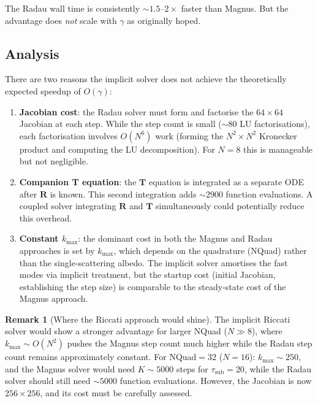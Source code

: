 \documentclass[11pt,a4paper]{article}
\newcommand{\mat}[1]{\mathbf{#1}}
\newcommand{\tsub}{\tau_{\mathrm{sub}}}
\newcommand{\kmax}{k_{\max}}
\theoremstyle{definition}
\newtheorem{remark}{Remark}
\begin{document}
The Radau wall time is consistently ${\sim}1.5$--$2\times$ faster
than Magnus.  But the advantage does \emph{not} scale with $\gamma$
as originally hoped.

\subsection{Analysis}

There are two reasons the implicit solver does not achieve the
theoretically expected speedup of $O(\gamma)$:

\begin{enumerate}
\item \textbf{Jacobian cost}: the Radau solver must form and
  factorise the $64\times 64$ Jacobian at each step.  While the
  step count is small ($\sim 80$ LU factorisations), each
  factorisation involves $O(N^6)$ work (forming the $N^2\times N^2$
  Kronecker product and computing the LU decomposition).  For $N=8$
  this is manageable but not negligible.

\item \textbf{Companion T equation}: the $\mat{T}$ equation is
  integrated as a separate ODE after $\mat{R}$ is known.  This
  second integration adds $\sim 2900$ function evaluations.  A
  coupled solver integrating $\mat{R}$ and $\mat{T}$ simultaneously
  could potentially reduce this overhead.

\item \textbf{Constant $\kmax$}: the dominant cost in both the Magnus
  and Radau approaches is set by $\kmax$, which depends on the
  quadrature (NQuad) rather than the single-scattering albedo.  The
  implicit solver amortises the fast modes via implicit treatment, but
  the startup cost (initial Jacobian, establishing the step size) is
  comparable to the steady-state cost of the Magnus approach.
\end{enumerate}

\begin{remark}[Where the Riccati approach would shine]
The implicit Riccati solver would show a stronger advantage for
larger NQuad ($N\gg 8$), where $\kmax\sim O(N^2)$ pushes the Magnus
step count much higher while the Radau step count remains
approximately constant.  For NQuad${}=32$ ($N=16$): $\kmax\sim 250$,
and the Magnus solver would need $K\sim 5000$ steps for $\tsub=20$,
while the Radau solver should still need $\sim 5000$ function
evaluations.  However, the Jacobian is now $256\times 256$,
and its cost must be carefully assessed.
\end{remark}
\end{document}
